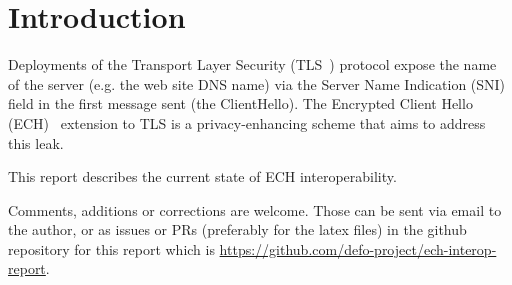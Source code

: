 \section{Introduction}

Deployments of the Transport Layer Security (TLS~\cite{rfc8446}) protocol
expose the name of the server (e.g. the web site DNS name) via the Server Name
Indication (SNI) field in the first message sent (the ClientHello).  The
Encrypted Client Hello (ECH)~\cite{draft-ietf-tls-esni} extension to TLS is a
privacy-enhancing scheme that aims to address this leak.

This report describes the current state of ECH interoperability.

Comments, additions or corrections are welcome. Those can be sent via
email to the author, or as issues or PRs (preferably for the latex files) in 
the github repository for this report which is 
\url{https://github.com/defo-project/ech-interop-report}.
